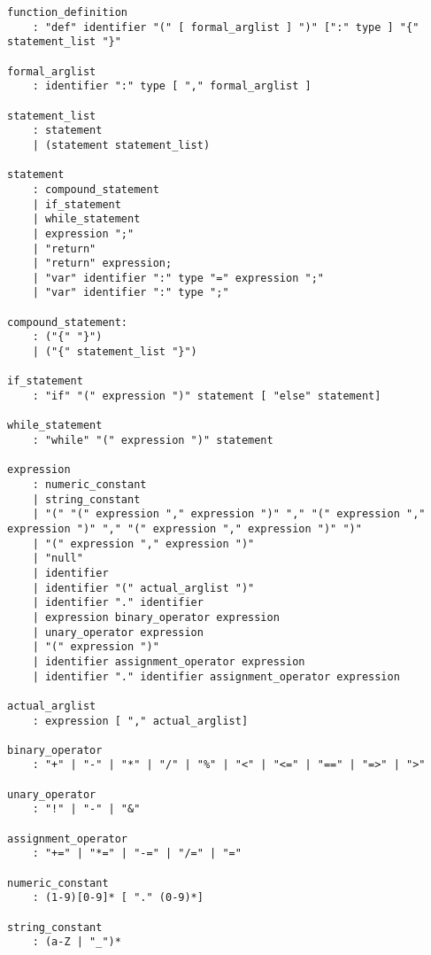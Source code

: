\documentclass[12pt]{article}
\begin{document}
\begin{lstlisting}[basicstyle=\tiny,tabsize=3]
function_definition
    : "def" identifier "(" [ formal_arglist ] ")" [":" type ] "{" statement_list "}"

formal_arglist
    : identifier ":" type [ "," formal_arglist ]

statement_list
    : statement
    | (statement statement_list)

statement
    : compound_statement
    | if_statement
    | while_statement
    | expression ";"
    | "return"
    | "return" expression;
    | "var" identifier ":" type "=" expression ";"
    | "var" identifier ":" type ";"

compound_statement:
    : ("{" "}")
    | ("{" statement_list "}")

if_statement
    : "if" "(" expression ")" statement [ "else" statement]

while_statement
    : "while" "(" expression ")" statement

expression
    : numeric_constant
    | string_constant
    | "(" "(" expression "," expression ")" "," "(" expression "," expression ")" "," "(" expression "," expression ")" ")"
    | "(" expression "," expression ")"
    | "null"
    | identifier
    | identifier "(" actual_arglist ")"
    | identifier "." identifier
    | expression binary_operator expression
    | unary_operator expression
    | "(" expression ")"
    | identifier assignment_operator expression
    | identifier "." identifier assignment_operator expression

actual_arglist
    : expression [ "," actual_arglist]

binary_operator
    : "+" | "-" | "*" | "/" | "%" | "<" | "<=" | "==" | "=>" | ">"

unary_operator
    : "!" | "-" | "&"

assignment_operator
    : "+=" | "*=" | "-=" | "/=" | "="

numeric_constant
    : (1-9)[0-9]* [ "." (0-9)*]

string_constant
    : (a-Z | "_")*
\end{lstlisting}
\end{document}
